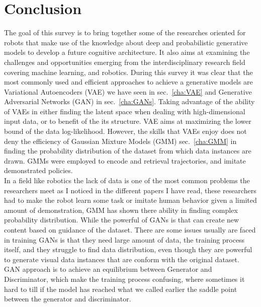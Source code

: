 
\pagestyle{fancy} 
\chapter*{Conclusion}
\vspace{-15pt}

The goal of this survey is to bring together some of the researches oriented for robots that make use of the knowledge about deep and probabilistic generative models to develop a future cognitive architecture. It also aims at examining the challenges and opportunities emerging from the interdisciplinary research field covering machine learning, and robotics. During this survey it was clear that the most commonly used and efficient approaches to achieve a generative models are Variational Autoencoders (VAE) we have seen in sec.~\ref{cha:VAE} and Generative Adversarial Networks (GAN) in sec.~\ref{cha:GANs}. Taking advantage of the ability of VAEs in either finding the latent space when dealing with high-dimensional input data, or to benefit of the its structure. VAE aims at maximizing the lower bound of the data log-likelihood. However, the skills that VAEs enjoy does not deny the efficiency of Gaussian Mixture Models (GMM) sec.~\ref{cha:GMM} in finding the probability distribution of the dataset from which data instances are drawn. GMMs were employed to encode and retrieval trajectories, and imitate demonstrated policies.\\ In a field like robotics the lack of data is one of the most common problems the researchers meet as I noticed in the different papers I have read, these researchers had to make the robot learn some task or imitate human behavior given a limited amount of demonstration, GMM has shown there ability in finding complex probability distribution. While the powerful of GANs is that can create new content based on guidance of the dataset. There are some issues usually are faced in training GANs is that they need large amount of data, the training process itself, and they struggle to find data distribution, even though they are powerful to generate visual data instances that are conform with the original dataset. GAN approach is to achieve an equilibrium between Generator and Discriminator, which make the training process confusing, where sometimes it hard to till if the model has reached what we called earlier the saddle point between the generator and discriminator.\\
